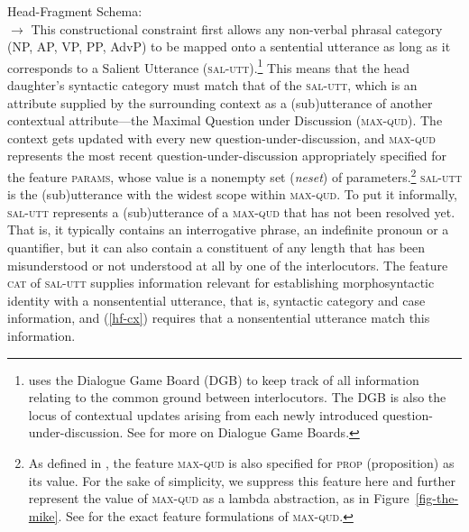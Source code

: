 \eas
\label{hf-cx}
Head-Fragment Schema:\\
$\rightarrow$
\zs
%
%
This constructional constraint first allows 
any non-verbal phrasal category (NP, AP, VP, PP, AdvP) to be mapped onto a sentential utterance as
long as it corresponds to a Salient Utterance (\textsc{sal-utt}).\footnote{\citet{Ginzburg2012} uses
  the Dialogue Game Board (DGB) to keep track of all information relating to the common ground between interlocutors. The DGB is also the locus of contextual updates arising from each newly introduced question-under-discussion. See  for more on Dialogue Game Boards.
}
 This means that
the head daughter's syntactic category must match that of the \textsc{sal-utt}, which is an attribute supplied by the surrounding context as a (sub)utterance of another contextual attribute---the Maximal Question under Discussion (\textsc{max-qud}). The context gets updated with every new question-under-discussion, and \textsc{max-qud} represents the most recent question-under-discussion appropriately specified for the feature \textsc{params}, whose value is a nonempty set (\textit{neset}) of parameters.\footnote{As defined in \citet[304]{Ginzburg:Sag:2000}, the feature \textsc{max-qud} is also specified for \textsc{prop} (proposition) as its value. For the sake of simplicity, we suppress this feature here and further 
represent the value of
\textsc{max-qud} as a lambda abstraction, as in Figure~\ref{fig-the-mike}. 
See \citet[304]{Ginzburg:Sag:2000} for the
exact feature formulations of \textsc{max-qud}.} \textsc{sal-utt} is the (sub)utterance with the widest scope within \textsc{max-qud}. To put it informally, \textsc{sal-utt} represents a (sub)utterance of a \textsc{max-qud} that has not been resolved yet. That is, it typically contains an interrogative phrase, an indefinite pronoun or a quantifier, but it can also contain a constituent of any length that has been misunderstood or not understood at all by one of the interlocutors. The feature \textsc{cat} of \textsc{sal-utt} supplies information relevant for establishing morphosyntactic identity with a nonsentential utterance, that is, syntactic category and case information, and (\ref{hf-cx}) requires that a nonsentential utterance  match this information. 

